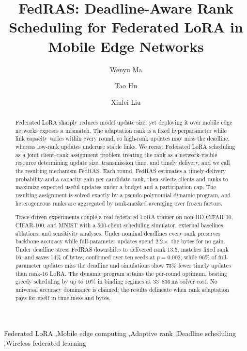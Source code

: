 \documentclass[preprint,12pt]{elsarticle}
\begin{document}
\begin{frontmatter}
\title{FedRAS: Deadline-Aware Rank Scheduling for Federated LoRA in Mobile Edge Networks}
\author[inst1,inst2,inst3]{Wenyu Ma}
\author[inst1,inst2,inst3]{Tao Hu}
\author[inst1,inst2,inst3]{Xinlei Liu}
\address[inst1]{Information Engineering University, Zhengzhou 450001, China}
\address[inst2]{Key Laboratory of Cyberspace Endogenous Safety and Security of Henan Province, Zhengzhou 450001, China}
\address[inst3]{Key Laboratory of Cyberspace Security, Ministry of Education of China, Zhengzhou 450001, China}

\begin{abstract}
Federated LoRA sharply reduces model update size, yet deploying it over mobile edge networks exposes a mismatch. The adaptation rank is a fixed hyperparameter while link capacity varies within every round, so high-rank updates may miss the deadline, whereas low-rank updates underuse stable links. We recast Federated LoRA scheduling as a joint client--rank assignment problem treating the rank as a network-visible resource determining update size, transmission time, and timely delivery, and we call the resulting mechanism FedRAS. Each round, FedRAS estimates a timely-delivery probability and a capacity gain per candidate rank, then selects clients and ranks to maximize expected useful updates under a budget and a participation cap. The resulting assignment is solved exactly by a pseudo-polynomial dynamic program, and heterogeneous ranks are aggregated by rank-masked averaging over frozen factors.

Trace-driven experiments couple a real federated LoRA trainer on non-IID CIFAR-10, CIFAR-100, and MNIST with a 500-client scheduling simulator, external baselines, ablations, and sensitivity analyses. Under nominal deadlines every rank preserves backbone accuracy while full-parameter updates spend $2.2\times$ the bytes for no gain. Under deadline stress FedRAS downshifts to delivered rank 13.5, matches fixed rank 16, and saves 14\% of bytes, confirmed over ten seeds at $p{=}0.002$, while 96\% of full-parameter updates miss the deadline and simulations show 73\% fewer timely updates than rank-16 LoRA. The dynamic program attains the per-round optimum, beating greedy scheduling by up to 10\% in binding regimes at 33--836\,ms solver cost. No universal accuracy dominance is claimed; the results delineate when rank adaptation pays for itself in timeliness and bytes.
\end{abstract}

\begin{keyword}
Federated LoRA \sep Mobile edge computing \sep Adaptive rank \sep Deadline scheduling \sep Wireless federated learning
\end{keyword}
\end{frontmatter}
\end{document}
